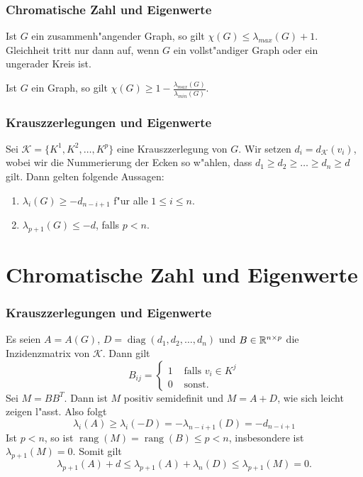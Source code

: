 \documentclass{beamer}
\begin{document}
  \begin{frame}[<+->]
    \frametitle{Chromatische Zahl und Eigenwerte}
    \begin{proposition}[Wilf]
      Ist $G$ ein zusammenh"angender Graph, so gilt $\chi(G) \leq \lambda_{max}(G) +1$. Gleichheit tritt nur dann auf, wenn $G$ ein vollst"andiger Graph oder ein ungerader Kreis ist.
    \end{proposition}
    \begin{proposition}[Hoffman]
      Ist $G$ ein Graph, so gilt $\chi(G) \geq 1- \frac{\lambda_{max}(G)}{\lambda_{min}(G)}$. 
    \end{proposition}
  \end{frame}
  \begin{frame}[<+->]
    \frametitle{Krauszzerlegungen und Eigenwerte}
    \begin{proposition}
      Sei $\mathcal{K} = \{K^{1}, K^{2}, \dots , K^{p} \}$ eine Krauszzerlegung von $G$. Wir setzen $d_i = d_{\mathcal{K}}(v_i)$, wobei wir die Nummerierung der Ecken so w"ahlen, dass $d_1 \geq d_2 \geq \dots \geq d_n\geq d$ gilt.
      Dann gelten folgende Aussagen:
      \begin{enumerate}
        \item $\lambda_{i}(G) \geq -d_{n-i+1}$ f"ur alle $1 \leq i \leq n$. 
        \item $\lambda_{p+1}(G) \leq -d$, falls $p< n$.
      \end{enumerate}
    \end{proposition}
  \end{frame}

  \section{Chromatische Zahl und Eigenwerte}

  \begin{frame}[<+->]
    \frametitle{Krauszzerlegungen und Eigenwerte}

    Es seien $A= A(G)$, $D= \operatorname{diag}(d_1,d_2,\dots,d_n)$ und $B\in{\mathbb{R}}^{n\times p}$ die Inzidenzmatrix von $\mathcal{K}$. Dann gilt
    $$ B_{ij} = \begin{cases}
      1 & \text{ falls } v_i\in K^{j} \\
      0 & \text{ sonst.} 
    \end{cases} $$
    \pause
    Sei $M=BB^{T}$. Dann ist $M$ positiv semidefinit und $M=A+D$, wie sich leicht zeigen l"asst. \pause Also folgt 
    $$\lambda_{i}(A) \geq \lambda_{i}(-D) = -\lambda_{n-i+1}(D) = -d_{n-i+1}$$
    \pause
    Ist $p < n$, so ist $\operatorname{rang}(M) = \operatorname{rang} (B) \leq p < n$, insbesondere ist $\lambda_{p+1}(M) = 0$. 
    \pause
    Somit gilt
    $$\lambda_{p+1}(A) + d  \leq \lambda_{p+1}(A) + \lambda_{n}(D) \leq \lambda_{p+1}(M) = 0. $$
  \end{frame}
\end{document}
